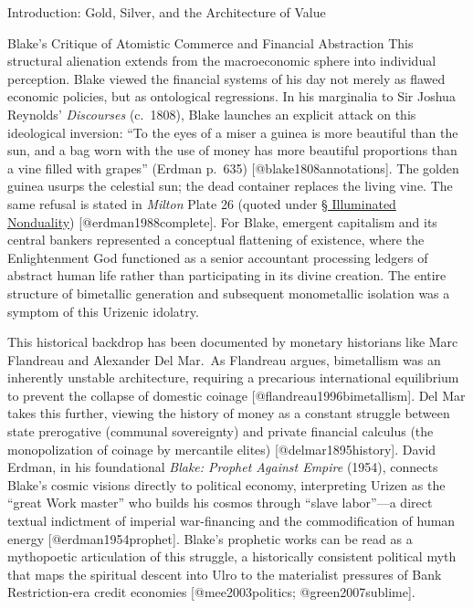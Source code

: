 \documentclass[
  ignorenonframetext,
]{beamer}
\begin{document}
\begin{frame}{Introduction: Gold, Silver, and the Architecture of Value}
\begin{block}{Blake's Critique of Atomistic Commerce and Financial
Abstraction}
This structural alienation extends from the macroeconomic sphere into
individual perception. Blake viewed the financial systems of his day not
merely as flawed economic policies, but as ontological regressions. In
his marginalia to Sir Joshua Reynolds' \emph{Discourses} (c.~1808),
Blake launches an explicit attack on this ideological inversion: ``To
the eyes of a miser a guinea is more beautiful than the sun, and a bag
worn with the use of money has more beautiful proportions than a vine
filled with grapes'' (Erdman p.~635) {[}@blake1808annotations{]}. The
golden guinea usurps the celestial sun; the dead container replaces the
living vine. The same refusal is stated in \emph{Milton} Plate 26
(quoted under \hyperlink{sec-illuminated-nonduality}{§ Illuminated
Nonduality}) {[}@erdman1988complete{]}. For Blake, emergent capitalism
and its central bankers represented a conceptual flattening of
existence, where the Enlightenment God functioned as a senior accountant
processing ledgers of abstract human life rather than participating in
its divine creation. The entire structure of bimetallic generation and
subsequent monometallic isolation was a symptom of this Urizenic
idolatry.

This historical backdrop has been documented by monetary historians like
Marc Flandreau and Alexander Del Mar.~As Flandreau argues, bimetallism
was an inherently unstable architecture, requiring a precarious
international equilibrium to prevent the collapse of domestic coinage
{[}@flandreau1996bimetallism{]}. Del Mar takes this further, viewing the
history of money as a constant struggle between state prerogative
(communal sovereignty) and private financial calculus (the
monopolization of coinage by mercantile elites)
{[}@delmar1895history{]}. David Erdman, in his foundational \emph{Blake:
Prophet Against Empire} (1954), connects Blake's cosmic visions directly
to political economy, interpreting Urizen as the ``great Work master''
who builds his cosmos through ``slave labor''---a direct textual
indictment of imperial war-financing and the commodification of human
energy {[}@erdman1954prophet{]}. Blake's prophetic works can be read as
a mythopoetic articulation of this struggle, a historically consistent
political myth that maps the spiritual descent into Ulro to the
materialist pressures of Bank Restriction-era credit economies
{[}@mee2003politics; @green2007sublime{]}.
\end{block}


\end{frame}
\end{document}

